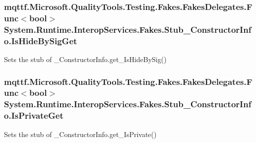 \hypertarget{class_system_1_1_runtime_1_1_interop_services_1_1_fakes_1_1_stub___constructor_info_a28e129ec0d4184141375fbabac96b86f}{
\subsubsection[{Is\-Hide\-By\-Sig\-Get}]{\setlength{\rightskip}{0pt plus 5cm}mqttf.\-Microsoft.\-Quality\-Tools.\-Testing.\-Fakes.\-Fakes\-Delegates.\-Func$<$bool$>$ System.\-Runtime.\-Interop\-Services.\-Fakes.\-Stub\-\_\-\-Constructor\-Info.\-Is\-Hide\-By\-Sig\-Get}}\label{class_system_1_1_runtime_1_1_interop_services_1_1_fakes_1_1_stub___constructor_info_a28e129ec0d4184141375fbabac96b86f}


Sets the stub of \-\_\-\-Constructor\-Info.\-get\-\_\-\-Is\-Hide\-By\-Sig()

\hypertarget{class_system_1_1_runtime_1_1_interop_services_1_1_fakes_1_1_stub___constructor_info_a0fe48f594442d0bfd650b7041e523d1b}{
\subsubsection[{Is\-Private\-Get}]{\setlength{\rightskip}{0pt plus 5cm}mqttf.\-Microsoft.\-Quality\-Tools.\-Testing.\-Fakes.\-Fakes\-Delegates.\-Func$<$bool$>$ System.\-Runtime.\-Interop\-Services.\-Fakes.\-Stub\-\_\-\-Constructor\-Info.\-Is\-Private\-Get}}\label{class_system_1_1_runtime_1_1_interop_services_1_1_fakes_1_1_stub___constructor_info_a0fe48f594442d0bfd650b7041e523d1b}


Sets the stub of \-\_\-\-Constructor\-Info.\-get\-\_\-\-Is\-Private()


